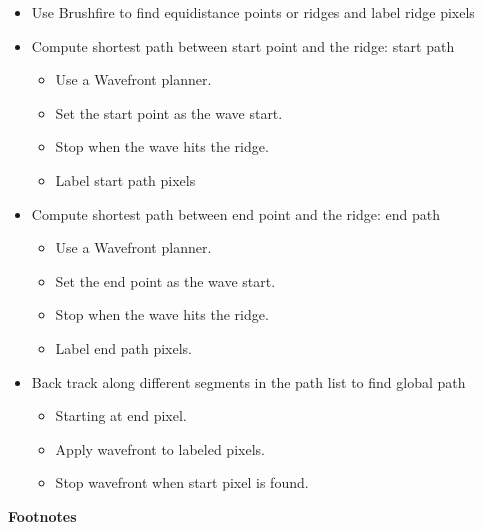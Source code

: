 \begin{itemize}
\tightlist
\item
  Use Brushfire to find equidistance points or ridges and label ridge
  pixels
\item
  Compute shortest path between start point and the ridge: start path

  \begin{itemize}
  \tightlist
  \item
    Use a Wavefront planner.
  \item
    Set the start point as the wave start.
  \item
    Stop when the wave hits the ridge.
  \item
    Label start path pixels
  \end{itemize}
\item
  Compute shortest path between end point and the ridge: end path

  \begin{itemize}
  \tightlist
  \item
    Use a Wavefront planner.
  \item
    Set the end point as the wave start.
  \item
    Stop when the wave hits the ridge.
  \item
    Label end path pixels.
  \end{itemize}
\item
  Back track along different segments in the path list to find global
  path

  \begin{itemize}
  \tightlist
  \item
    Starting at end pixel.
  \item
    Apply wavefront to labeled pixels.
  \item
    Stop wavefront when start pixel is found.
  \end{itemize}
\end{itemize}

\textbf{Footnotes}
